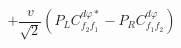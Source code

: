 %
\begin{dmath*}
%
  +  \frac{v}{\sqrt{2}} \left(P_L C^{d \varphi  *}_{f_2 f_1} - P_R C^{d \varphi  }_{f_1 f_2}\right)
%
\end{dmath*}
%
